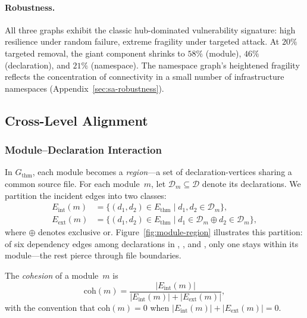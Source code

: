 \paragraph{Robustness.}
All three graphs exhibit the classic hub-dominated vulnerability signature: high resilience under random failure, extreme fragility under targeted attack. At $20\%$ targeted removal, the giant component shrinks to $58\%$ (module), $46\%$ (declaration), and $21\%$ (namespace). The namespace graph's heightened fragility reflects the concentration of connectivity in a small number of infrastructure namespaces (Appendix~\ref{sec:sa-robustness}).

\subsection{Cross-Level Alignment}
\label{sec:cross-level-summary}

\subsubsection{Module--Declaration Interaction}
\label{sec:cohesion-main}

In $G_{\mathrm{thm}}$, each module becomes a \emph{region}---a set of declaration-vertices sharing a common source file. For each module~$m$, let $\mathcal{D}_m \subseteq \mathcal{D}$ denote its declarations. We partition the incident edges into two classes:
\begin{align*}
  E_{\mathrm{int}}(m) &= \{(d_1, d_2) \in E_{\mathrm{thm}} \mid d_1, d_2 \in \mathcal{D}_m\}, \\
  E_{\mathrm{ext}}(m) &= \{(d_1, d_2) \in E_{\mathrm{thm}} \mid d_1 \in \mathcal{D}_m \oplus d_2 \in \mathcal{D}_m\},
\end{align*}
where $\oplus$ denotes exclusive or. Figure~\ref{fig:module-region} illustrates this partition: of six dependency edges among declarations in , , and , only one stays within its module---the rest pierce through file boundaries.

\begin{definition}
\label{def:cohesion}
The \emph{cohesion} of a module~$m$ is
\[
  \mathrm{coh}(m) = \frac{|E_{\mathrm{int}}(m)|}{|E_{\mathrm{int}}(m)| + |E_{\mathrm{ext}}(m)|},
\]
with the convention that $\mathrm{coh}(m) = 0$ when $|E_{\mathrm{int}}(m)| + |E_{\mathrm{ext}}(m)| = 0$.
\end{definition}

